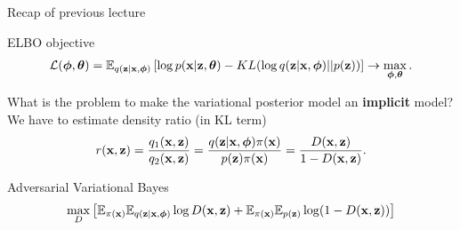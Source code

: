 

\begin{frame}
\titlepage
\end{frame}
\begin{frame}{Recap of previous lecture}
\vspace{-0.3cm}
	\begin{block}{ELBO objective}
		\vspace{-0.5cm}
		\[
			 \mathcal{L} (\boldsymbol{\phi}, \boldsymbol{\theta})  = \mathbb{E}_{q(\mathbf{z} | \mathbf{x}, \boldsymbol{\phi})} \left[\log p(\mathbf{x} | \mathbf{z}, \boldsymbol{\theta}) - KL(\log q(\mathbf{z}| \mathbf{x}, \boldsymbol{\phi}) || p(\mathbf{z})) \right] \rightarrow \max_{\boldsymbol{\phi}, \boldsymbol{\theta}}.
		\]	
		\vspace{-0.5cm}
	\end{block}
	What is the problem to make the variational posterior model an \textbf{implicit} model? \\
	 We have to estimate density ratio (in KL term)
	\[
		r(\mathbf{x}, \mathbf{z}) = \frac{q_1(\mathbf{x}, \mathbf{z})}{q_2(\mathbf{x}, \mathbf{z})} = \frac{q(\mathbf{z}| \mathbf{x}, \boldsymbol{\phi}) \pi (\mathbf{x})}{p(\mathbf{z}) \pi(\mathbf{x})} = \frac{D(\mathbf{x}, \mathbf{z})}{1 - D(\mathbf{x}, \mathbf{z})}.
	\] 
	\begin{block}{Adversarial Variational Bayes}
		\vspace{-0.6cm}
		\[
			\max_D \left[ \mathbb{E}_{\pi(\mathbf{x})} \mathbb{E}_{q(\mathbf{z} | \mathbf{x}, \boldsymbol{\phi})} \log D(\mathbf{x}, \mathbf{z}) + \mathbb{E}_{\pi(\mathbf{x})} \mathbb{E}_{p(\mathbf{z})} \log (1 - D(\mathbf{x}, \mathbf{z})) \right]
		\]
	\end{block}
\end{frame}
